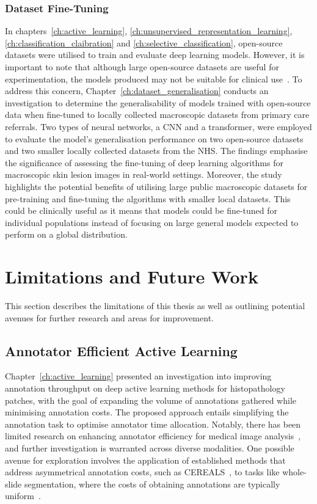 \subsubsection{Dataset Fine-Tuning}
In chapters~\ref{ch:active_learning}, \ref{ch:unsupervised_representation_learning}, \ref{ch:classification_claibration} and \ref{ch:selective_classification}, open-source datasets were utilised to train and evaluate deep learning models. However, it is important to note that although large open-source datasets are useful for experimentation, the models produced may not be suitable for clinical use~\citep{wu2022skin}. To address this concern, Chapter~\ref{ch:dataset_generalisation} conducts an investigation to determine the generalisability of models trained with open-source data when fine-tuned to locally collected macroscopic datasets from primary care referrals. Two types of neural networks, a CNN and a transformer, were employed to evaluate the model’s generalisation performance on two open-source datasets and two smaller locally collected datasets from the NHS. The findings emphasise the significance of assessing the fine-tuning of deep learning algorithms for macroscopic skin lesion images in real-world settings. Moreover, the study highlights the potential benefits of utilising large public macroscopic datasets for pre-training and fine-tuning the algorithms with smaller local datasets. This could be clinically useful as it means that models could be fine-tuned for individual populations instead of focusing on large general models expected to perform on a global distribution.



\section{Limitations and Future Work}
This section describes the limitations of this thesis as well as outlining potential avenues for further research and areas for improvement.

\subsection{Annotator Efficient Active Learning}
Chapter~\ref{ch:active_learning} presented an investigation into improving annotation throughput on deep active learning methods for histopathology patches, with the goal of expanding the volume of annotations gathered while minimising annotation costs. The proposed approach entails simplifying the annotation task to optimise annotator time allocation. Notably, there has been limited research on enhancing annotator efficiency for medical image analysis~\citep{ren2021survey}, and further investigation is warranted across diverse modalities. One possible avenue for exploration involves the application of established methods that address asymmetrical annotation costs, such as CEREALS~\citep{mackowiak2018cereals}, to tasks like whole-slide segmentation, where the costs of obtaining annotations are typically uniform~\citep{budd2021survey}.

